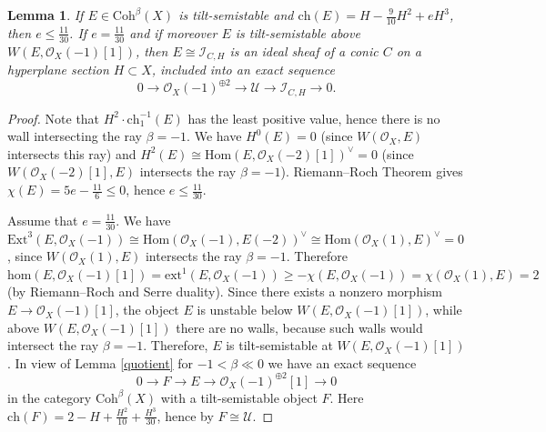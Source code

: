 \documentclass{amsart}
\newtheorem{lemma}[theorem]{Lemma}
\begin{document}
	\begin{lemma}\label{0 1 -9/10} If $E\in\mathrm{Coh}^\beta(X)$ is tilt-semistable and $\mathrm{ch}(E)=H-\frac{9}{10}H^2+eH^3$, then $e\le\frac{11}{30}$. If $e=\frac{11}{30}$ and if moreover $E$ is tilt-semistable above $W(E,\mathcal O_X(-1)[1])$, then $E\cong\mathcal I_{C,H}$ is an ideal sheaf of a conic $C$ on a hyperplane section $H\subset X$, included into an exact sequence
	\begin{equation}\label{triple15}0\to\mathcal O_X(-1)^{\oplus 2}\to\mathcal U\to\mathcal I_{C,H}\to 0.\end{equation} 
	\end{lemma}
	
	\begin{proof} Note that $H^2\cdot\mathrm{ch}_1^{-1}(E)$	has the least positive value, hence there is no wall intersecting the ray $\beta=-1$. We have $H^0(E)=0$ (since $W(\mathcal O_X,E)$ intersects this ray) and $H^2(E)\cong\mathrm{Hom}(E,\mathcal O_X(-2)[1])^\vee=0$ (since $W(\mathcal O_X(-2)[1],E)$ intersects the ray $\beta=-1$). Riemann--Roch Theorem gives $\chi(E)=5e-\frac{11}{6}\le 0$, hence $e\le\frac{11}{30}$. 
		
	Assume that $e=\frac{11}{30}$. We have $\mathrm{Ext}^3(E,\mathcal O_X(-1))\cong\mathrm{Hom}(\mathcal O_X(-1),E(-2))^\vee\cong\mathrm{Hom}(\mathcal O_X(1),E)^\vee=0$, since $W(\mathcal O_X(1),E)$ intersects the ray $\beta=-1$. Therefore $\mathrm{hom}(E,\mathcal O_X(-1)[1])=\mathrm{ext}^1(E,\mathcal O_X(-1))\ge-\chi(E,\mathcal O_X(-1))=\chi(\mathcal O_X(1),E)=2$ (by Riemann--Roch and Serre duality). Since there exists a nonzero morphism $E\to\mathcal O_X(-1)[1]$, the object $E$ is unstable below $W(E,\mathcal O_X(-1)[1])$, while above $W(E,\mathcal O_X(-1)[1])$ there are no walls, because such walls would intersect the ray $\beta=-1$. Therefore, $E$ is tilt-semistable at $W(E,\mathcal O_X(-1)[1])$. In view of Lemma \ref{quotient} for $-1<\beta\ll 0$ we have an exact sequence
	\begin{equation}\label{triple7}0\to F\to E\to\mathcal O_X(-1)^{\oplus 2}[1]\to 0\end{equation}
	in the category $\mathrm{Coh}^\beta(X)$ with a tilt-semistable object $F$. Here $\mathrm{ch}(F)=2-H+\frac{H^2}{10}+\frac{H^3}{30}$, hence by \cite[Lemma 3.6]{Vass} $F\cong\mathcal U$.
		

\end{proof}
\end{document}
